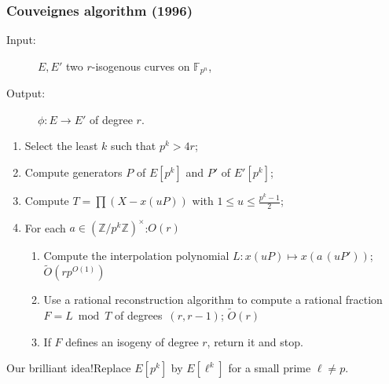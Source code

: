 \documentclass[10pt]{beamer}
\theoremstyle{plain}
\theoremstyle{definition}
\theoremstyle{definition}
\theoremstyle{definition}
\theoremstyle{definition}
\theoremstyle{remark}
\theoremstyle{remark}
\newcommand{\orangebox}[2]{\begin{block}{#1}#2\end{block}}
\def\F{\mathbb{F}}
\begin{document}
\begin{frame}
  \frametitle{Couveignes algorithm (1996)}
  \orangebox{}{
    \begin{description}
    \item[Input:] $E, E'$ two $r$-isogenous curves on $\F_{p^n}$,
    \item[Output:] $\phi: E \rightarrow E'$ of degree $r$.
    \end{description}}
    
  \begin{enumerate}
  \item Select the least $k$ such that $p^k >  4r$;
  \item Compute generators $P$ of
    $E[p^k]$ and $P'$ of $E'[p^k]$;
  \item Compute $T=\prod(X-x(uP))$ with $1\le u \le \frac{p^k-1}{2}$;
  \item For each $a \in \left( \mathbb{Z}/p^k\mathbb{Z}\right)^{\times}$:\hfill $O(r)$
    \begin{enumerate}
    \item Compute the interpolation polynomial
      $L: x (u P) \mapsto x(a\, (uP'))$;
      \hfill $\tilde{O}(r p^{O(1)})$
    \item Use a  rational reconstruction  algorithm 
      to compute a rational
      fraction $F=L\bmod{T}$ of degrees~$(r, r-1)$;
      \hfill $\tilde{O}(r)$
    \item If $F$ defines an isogeny of degree $r$, return it and
      stop.
    \end{enumerate}
  \end{enumerate}

  \pause
  \orangebox{Our brilliant idea!} {Replace $E[p^k]$ by \boldmath $E[\ell^k]$ \unboldmath for
    a small prime $\ell \neq p$.}
\end{frame}

\end{document}
